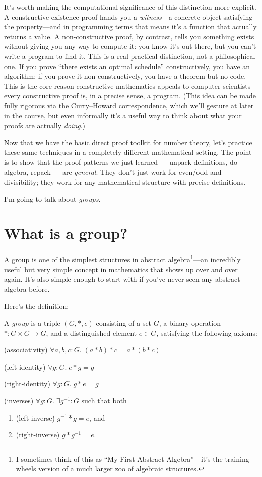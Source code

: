 \documentclass[11pt]{article}
\begin{document}
It's worth making the computational significance of this distinction more explicit. A constructive existence proof hands you a \emph{witness}---a concrete object satisfying the property---and in programming terms that means it's a function that actually returns a value. A non-constructive proof, by contrast, tells you something exists without giving you any way to compute it: you know it's out there, but you can't write a program to find it. This is a real practical distinction, not a philosophical one. If you prove ``there exists an optimal schedule'' constructively, you have an algorithm; if you prove it non-constructively, you have a theorem but no code. This is the core reason constructive mathematics appeals to computer scientists---every constructive proof is, in a precise sense, a program. (This idea can be made fully rigorous via the Curry--Howard correspondence, which we'll gesture at later in the course, but even informally it's a useful way to think about what your proofs are actually \emph{doing}.)

\bigskip

Now that we have the basic direct proof toolkit for number theory, let's practice these same techniques in a completely different mathematical setting. The point is to show that the proof patterns we just learned --- unpack definitions, do algebra, repack --- are \emph{general}. They don't just work for even/odd and divisibility; they work for any mathematical structure with precise definitions.

I'm going to talk about \emph{groups}.

\section{What is a group?}
A group is one of the simplest structures in abstract algebra\footnote{I sometimes think of this as ``My First Abstract Algebra''---it's the training-wheels version of a much larger zoo of algebraic structures.}---an incredibly useful but very simple concept in mathematics that shows up over and over again. It's also simple enough to start with if you've never seen any abstract algebra before.

Here's the definition:

\begin{definition}[Group]
A \emph{group} is a triple $(G, *, e)$ consisting of a set $G$, a binary operation $* : G \times G \to G$, and a distinguished element $e \in G$, satisfying the following axioms:

(associativity) $\forall a,b,c : G.\; (a * b) * c = a * (b * c)$

(left-identity) $\forall g : G.\; e * g = g$

(right-identity) $\forall g : G.\; g * e = g$

(inverses) $\forall g : G.\; \exists g^{-1} : G$ such that both
\begin{enumerate}
  \item (left-inverse) $g^{-1} * g = e$, and
  \item (right-inverse) $g * g^{-1} = e$.
\end{enumerate}
\end{definition}
\end{document}

